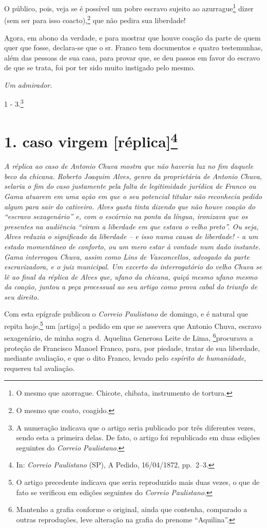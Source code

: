 {O público, pois, veja se é possível um pobre escravo sujeito ao
azurrague\footnote{ O mesmo que azorrague. Chicote, chibata,
  instrumento de tortura.} dizer (sem ser para isso coacto),\footnote{
  O mesmo que coato, coagido.} que não pedira sua liberdade!

Agora, em abono da verdade, e para mostrar que houve coação da parte de
quem quer que fosse, declara-se que o sr. Franco tem documentos e quatro
testemunhas, além das pessoas de sua casa, para provar que, se deu
passos em favor do escravo de que se trata, foi por ter sido muito
instigado pelo mesmo.

\emph{Um admirador}.

1 - 3.\footnote{ A numeração indicava que o artigo seria publicado por
  três diferentes vezes, sendo esta a primeira delas. De fato, o artigo
  foi republicado em duas edições seguintes do \emph{Correio
  Paulistano}.}

\chapter{1. caso virgem {[}réplica{]}\footnote{ In: \emph{Correio Paulistano} (SP), A Pedido, 16/04/1872,
  pp.~2--3.}} %

\begin{didascalia}
\emph{A réplica ao caso de Antonio Chuva mostra que não haveria luz no
fim daquele beco da chicana. Roberto Joaquim Alves, genro da
proprietária de Antonio Chuva, selaria o fim do caso justamente pela
falta de legitimidade jurídica de Franco ou Gama atuarem em uma ação em
que o seu potencial titular não reconhecia pedido algum para sair do
cativeiro. Alves gasta tinta dizendo que não houve coação do ``escravo
sexagenário'' e, com o escárnio na ponta da língua, ironizava que os
presentes na audiência ``viram a liberdade em que estava o velho preto''.
Ou seja, Alves reduzia o significado da liberdade -- e isso numa causa
de liberdade! - a um estado momentâneo de conforto, ou um mero estar à
vontade num dado instante. Gama interrogou Chuva, assim como Lins de
Vasconcellos, advogado da parte escravizadora, e o juiz municipal. Um
excerto do interrogatório do velho Chuva se lê ao final da réplica de
Alves que, ufano da chicana, quiçá mesmo ufano mesmo da coação, juntou a
peça processual ao seu artigo como prova cabal do triunfo de seu
direito.}
\end{didascalia}

\asterisc{}

Com esta epígrafe publicou o \emph{Correio Paulistano} de domingo, e é
natural que repita hoje,\footnote{ O artigo precedente indicava que
  seria reproduzido mais duas vezes, o que de fato se verificou em
  edições seguintes do \emph{Correio Paulistano}.} um {[}artigo{]} a
pedido em que se assevera que Antonio Chuva, escravo sexagenário, de
minha sogra d. Aquelina Generosa Leite de Lima, \footnote{ Mantenho a
  grafia conforme o original, ainda que contenha, comparado a outras
  reproduções, leve alteração na grafia do prenome ``Aquilina''.}procurava
a proteção de Francisco Manoel Franco, para, por piedade, tratar de sua
liberdade, mediante avaliação, e que o dito Franco, levado pelo
\emph{espírito de humanidade}, requereu tal avaliação.

}

